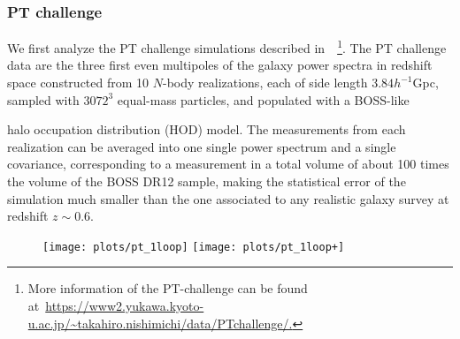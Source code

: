 \documentclass[12pt,a4paper]{article}
\renewcommand{\(}{\left(}
\renewcommand{\)}{\right)}
\begin{document}
\subsubsection{PT challenge}
We first analyze the PT challenge simulations described in~\cite{Nishimichi:2020tvu}~\footnote{More information of the PT-challenge can be found at~\url{https://www2.yukawa.kyoto-u.ac.jp/~takahiro.nishimichi/data/PTchallenge/.}}. 
The PT challenge data are the three first even multipoles of the galaxy power spectra in redshift space constructed from 10 $N$-body realizations, each of side length $3.84 h^{-1}$Gpc, sampled with $3072^3$ equal-mass particles, and populated with a BOSS-like {halo occupation distribution (HOD) model.
The measurements from each realization can be averaged into one single power spectrum and a single covariance, corresponding to a measurement in a total volume of about 100 times the volume of the BOSS DR12 sample, making the statistical error of the simulation much smaller than the one associated to any realistic galaxy {survey} at redshift $z \sim 0.6$. 

\begin{figure}[ht!]
\centering
\texttt{[image: plots/pt\_1loop]}
\texttt{[image: plots/pt\_1loop+]}\\ \vspace{0.3em}


\end{figure}}
\end{document}
